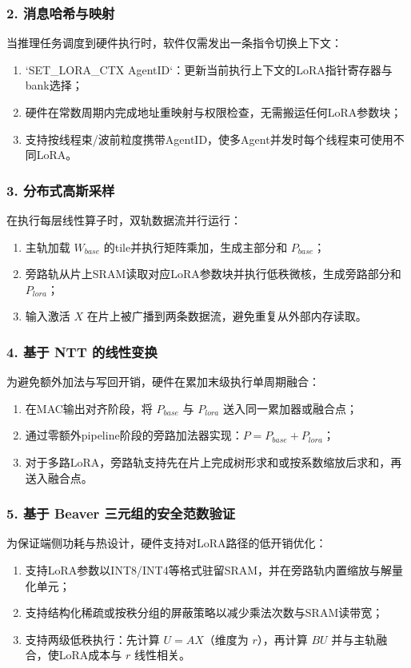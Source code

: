 \documentclass[12pt,a4paper]{article}
\begin{document}
\subsubsection{2. 消息哈希与映射}
当推理任务调度到硬件执行时，软件仅需发出一条指令切换上下文：
\begin{enumerate}
    \item `SET\_LORA\_CTX AgentID`：更新当前执行上下文的LoRA指针寄存器与bank选择；
    \item 硬件在常数周期内完成地址重映射与权限检查，无需搬运任何LoRA参数块；
    \item 支持按线程束/波前粒度携带AgentID，使多Agent并发时每个线程束可使用不同LoRA。
\end{enumerate}

\subsubsection{3. 分布式高斯采样}
在执行每层线性算子时，双轨数据流并行运行：
\begin{enumerate}
    \item 主轨加载 $W_{base}$ 的tile并执行矩阵乘加，生成主部分和 $P_{base}$；
    \item 旁路轨从片上SRAM读取对应LoRA参数块并执行低秩微核，生成旁路部分和 $P_{lora}$；
    \item 输入激活 $X$ 在片上被广播到两条数据流，避免重复从外部内存读取。
\end{enumerate}

\subsubsection{4. 基于 NTT 的线性变换}
为避免额外加法与写回开销，硬件在累加末级执行单周期融合：
\begin{enumerate}
    \item 在MAC输出对齐阶段，将 $P_{base}$ 与 $P_{lora}$ 送入同一累加器或融合点；
    \item 通过零额外pipeline阶段的旁路加法器实现：$P = P_{base} + P_{lora}$；
    \item 对于多路LoRA，旁路轨支持先在片上完成树形求和或按系数缩放后求和，再送入融合点。
\end{enumerate}

\subsubsection{5. 基于 Beaver 三元组的安全范数验证}
为保证端侧功耗与热设计，硬件支持对LoRA路径的低开销优化：
\begin{enumerate}
    \item 支持LoRA参数以INT8/INT4等格式驻留SRAM，并在旁路轨内置缩放与解量化单元；
    \item 支持结构化稀疏或按秩分组的屏蔽策略以减少乘法次数与SRAM读带宽；
    \item 支持两级低秩执行：先计算 $U = AX$（维度为 $r$），再计算 $BU$ 并与主轨融合，使LoRA成本与 $r$ 线性相关。
\end{enumerate}
\end{document}
